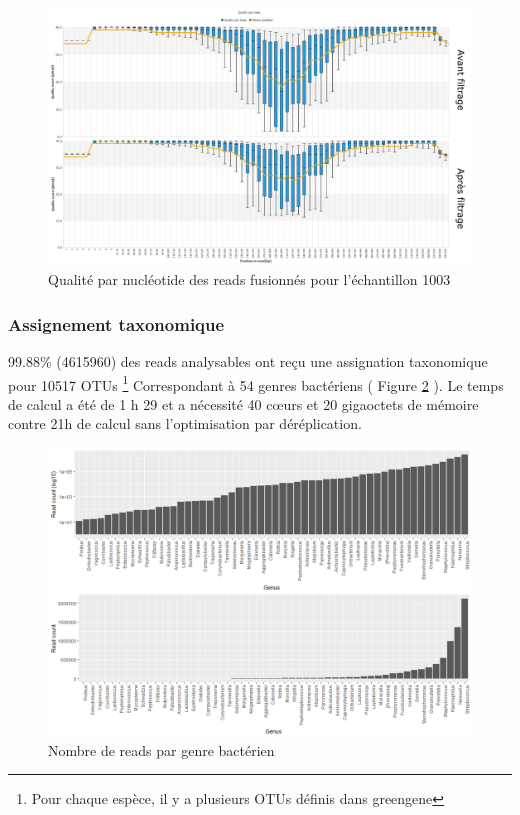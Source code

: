 \documentclass[12pt,a4paper]{article}
\begin{document}
\begin{figure}[h]
\begin{center}
\includegraphics[scale=0.45]{img/duo_merging.png}\hfill
\end{center}
\caption{Qualité par nucléotide des reads fusionnés pour l'échantillon 1003}
\label{fastqt_after}
\end{figure}


\subsubsection{Assignement taxonomique}
99.88\% (4615960) des reads analysables ont reçu une assignation taxonomique pour 10517 OTUs \footnote{Pour chaque espèce, il y a plusieurs OTUs définis dans greengene} Correspondant à 54 genres bactériens ( Figure \ref{readgenus} ). 
Le temps de calcul a été de 1 h 29 et a nécessité 40 cœurs et 20 gigaoctets de mémoire contre 21h de calcul sans l’optimisation par déréplication.


\begin{figure}[h]
\begin{center}
\includegraphics[scale=0.5]{img/read_count_genus_all.png}\hfill
\end{center}
\caption{Nombre de reads par genre bactérien}
\label{readgenus}
\end{figure}
\end{document}
